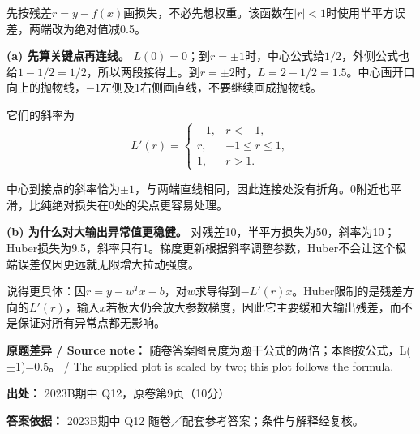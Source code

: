 先按残差\(r=y-f(x)\)画损失，不必先想权重。该函数在\(|r|<1\)时使用半平方误差，两端改为绝对值减0.5。


\textbf{(a) 先算关键点再连线。} \(L(0)=0\)；到\(r=\pm1\)时，中心公式给\(1/2\)，外侧公式也给\(1-1/2=1/2\)，所以两段接得上。到\(r=\pm2\)时，\(L=2-1/2=1.5\)。中心画开口向上的抛物线，\(-1\)左侧及1右侧画直线，不要继续画成抛物线。




它们的斜率为
\[
L'(r)=\begin{cases}-1,&r<-1,\\r,&-1\le r\le1,\\1,&r>1.\end{cases}
\]


中心到接点的斜率恰为\(\pm1\)，与两端直线相同，因此连接处没有折角。0附近也平滑，比纯绝对损失在0处的尖点更容易处理。


\textbf{(b) 为什么对大输出异常值更稳健。} 对残差10，半平方损失为50，斜率为10；Huber损失为9.5，斜率只有1。梯度更新根据斜率调整参数，Huber不会让这个极端误差仅因更远就无限增大拉动强度。


说得更具体：因\(r=y-w^Tx-b\)，对\(w\)求导得到\(-L'(r)x\)。Huber限制的是残差方向的\(L'(r)\)，输入\(x\)若极大仍会放大参数梯度，因此它主要缓和大输出残差，而不是保证对所有异常点都无影响。


\textbf{原题差异 / Source note：} 随卷答案图高度为题干公式的两倍；本图按公式，L(\ensuremath{\pm}1)=0.5。 / The supplied plot is scaled by two; this plot follows the formula.


\textbf{出处：} 2023B期中 Q12，原卷第9页（10分）


\textbf{答案依据：} 2023B期中 Q12 随卷／配套参考答案；条件与解释经复核。
